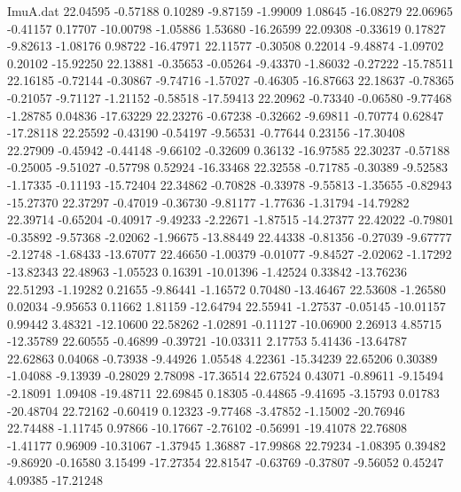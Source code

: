 \begin{filecontents}{ImuA.dat}
  22.04595   -0.57188    0.10289   -9.87159   -1.99009    1.08645  -16.08279
  22.06965   -0.41157    0.17707  -10.00798   -1.05886    1.53680  -16.26599
  22.09308   -0.33619    0.17827   -9.82613   -1.08176    0.98722  -16.47971
  22.11577   -0.30508    0.22014   -9.48874   -1.09702    0.20102  -15.92250
  22.13881   -0.35653   -0.05264   -9.43370   -1.86032   -0.27222  -15.78511
  22.16185   -0.72144   -0.30867   -9.74716   -1.57027   -0.46305  -16.87663
  22.18637   -0.78365   -0.21057   -9.71127   -1.21152   -0.58518  -17.59413
  22.20962   -0.73340   -0.06580   -9.77468   -1.28785    0.04836  -17.63229
  22.23276   -0.67238   -0.32662   -9.69811   -0.70774    0.62847  -17.28118
  22.25592   -0.43190   -0.54197   -9.56531   -0.77644    0.23156  -17.30408
  22.27909   -0.45942   -0.44148   -9.66102   -0.32609    0.36132  -16.97585
  22.30237   -0.57188   -0.25005   -9.51027   -0.57798    0.52924  -16.33468
  22.32558   -0.71785   -0.30389   -9.52583   -1.17335   -0.11193  -15.72404
  22.34862   -0.70828   -0.33978   -9.55813   -1.35655   -0.82943  -15.27370
  22.37297   -0.47019   -0.36730   -9.81177   -1.77636   -1.31794  -14.79282
  22.39714   -0.65204   -0.40917   -9.49233   -2.22671   -1.87515  -14.27377
  22.42022   -0.79801   -0.35892   -9.57368   -2.02062   -1.96675  -13.88449
  22.44338   -0.81356   -0.27039   -9.67777   -2.12748   -1.68433  -13.67077
  22.46650   -1.00379   -0.01077   -9.84527   -2.02062   -1.17292  -13.82343
  22.48963   -1.05523    0.16391  -10.01396   -1.42524    0.33842  -13.76236
  22.51293   -1.19282    0.21655   -9.86441   -1.16572    0.70480  -13.46467
  22.53608   -1.26580    0.02034   -9.95653    0.11662    1.81159  -12.64794
  22.55941   -1.27537   -0.05145  -10.01157    0.99442    3.48321  -12.10600
  22.58262   -1.02891   -0.11127  -10.06900    2.26913    4.85715  -12.35789
  22.60555   -0.46899   -0.39721  -10.03311    2.17753    5.41436  -13.64787
  22.62863    0.04068   -0.73938   -9.44926    1.05548    4.22361  -15.34239
  22.65206    0.30389   -1.04088   -9.13939   -0.28029    2.78098  -17.36514
  22.67524    0.43071   -0.89611   -9.15494   -2.18091    1.09408  -19.48711
  22.69845    0.18305   -0.44865   -9.41695   -3.15793    0.01783  -20.48704
  22.72162   -0.60419    0.12323   -9.77468   -3.47852   -1.15002  -20.76946
  22.74488   -1.11745    0.97866  -10.17667   -2.76102   -0.56991  -19.41078
  22.76808   -1.41177    0.96909  -10.31067   -1.37945    1.36887  -17.99868
  22.79234   -1.08395    0.39482   -9.86920   -0.16580    3.15499  -17.27354
  22.81547   -0.63769   -0.37807   -9.56052    0.45247    4.09385  -17.21248

\end{filecontents}
